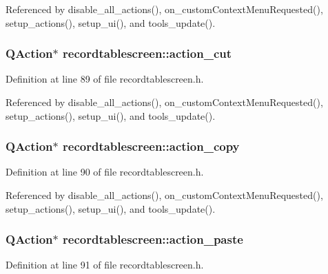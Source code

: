 Referenced by disable\_\-all\_\-actions(), on\_\-custom\-Context\-Menu\-Requested(), setup\_\-actions(), setup\_\-ui(), and tools\_\-update().
\subsubsection{\setlength{\rightskip}{0pt plus 5cm}QAction$\ast$ {\bf recordtablescreen::action\_\-cut}\hspace{0.3cm}{\tt  [private]}}\label{classrecordtablescreen_7c31f0fce3ad60ad8117b6954f9bd875}




Definition at line 89 of file recordtablescreen.h.

Referenced by disable\_\-all\_\-actions(), on\_\-custom\-Context\-Menu\-Requested(), setup\_\-actions(), setup\_\-ui(), and tools\_\-update().
\subsubsection{\setlength{\rightskip}{0pt plus 5cm}QAction$\ast$ {\bf recordtablescreen::action\_\-copy}\hspace{0.3cm}{\tt  [private]}}\label{classrecordtablescreen_7490f795a1262cf53d1f1e6455de0100}




Definition at line 90 of file recordtablescreen.h.

Referenced by disable\_\-all\_\-actions(), on\_\-custom\-Context\-Menu\-Requested(), setup\_\-actions(), setup\_\-ui(), and tools\_\-update().
\subsubsection{\setlength{\rightskip}{0pt plus 5cm}QAction$\ast$ {\bf recordtablescreen::action\_\-paste}\hspace{0.3cm}{\tt  [private]}}\label{classrecordtablescreen_4a5328fc69bfc95fd33635bdd190da4a}




Definition at line 91 of file recordtablescreen.h.


